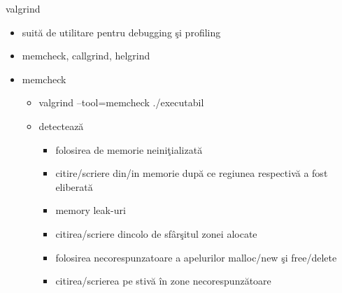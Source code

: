 \documentclass{so.cs.pub.ro}
\begin{document}
\begin{frame}{valgrind}
  \begin{itemize}
    \item suită de utilitare pentru debugging şi profiling 
	 \item memcheck, callgrind, helgrind
         \vspace*{0.2cm}
	 \item memcheck 
  \begin{itemize}
	\item valgrind --tool=memcheck ./executabil
	\item detectează
  \begin{itemize}
	\item folosirea de memorie neiniţializată
	\item citire/scriere din/in memorie după ce regiunea respectivă a fost eliberată
	\item memory leak-uri
	\item citirea/scriere dincolo de sfârşitul zonei alocate
	\item folosirea necorespunzatoare a apelurilor malloc/new şi free/delete
	\item citirea/scrierea  pe stivă în zone necorespunzătoare
	  \end{itemize}
	 \end{itemize}
  \end{itemize}
\end{frame}
\end{document}
